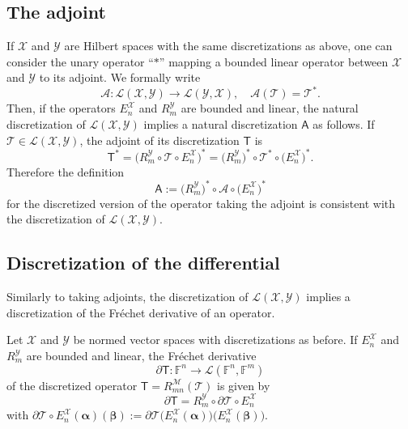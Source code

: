 \documentclass[a4paper]{paper}
\newcommand{\VecSpace}[1]{\mathscr{#1}}
\newcommand{\Field}{\mathbb{F}}
\newcommand{\Op}[1]{\mathcal{#1}}
\newcommand{\DiscOp}[1]{\mathsf{#1}}
\newcommand*{\REST}[2]{\ensuremath{R_{#1}^{#2}}}
\newcommand{\valpha}{\boldsymbol{\alpha}}
\newcommand{\vbeta}{\boldsymbol{\beta}}
\begin{document}
\subsection{The adjoint}

If $\VecSpace{X}$ and $\VecSpace{Y}$ are Hilbert spaces with the same discretizations as above, one can consider the unary operator 
``$\ast$'' mapping a bounded linear operator between $\VecSpace{X}$ and $\VecSpace{Y}$ to its adjoint. We formally write
\[
  \Op{A}: \VecSpace{L}(\VecSpace{X}, \VecSpace{Y}) \to \VecSpace{L}(\VecSpace{Y}, \VecSpace{X}), \quad \Op{A}(\Op{T}) = \Op{T}^*.
\]
Then, if the operators $E_n^{\VecSpace{X}}$ and $R_m^{\VecSpace{Y}}$ are bounded and linear, the natural discretization of 
$\VecSpace{L}(\VecSpace{X}, \VecSpace{Y})$ implies a natural discretization $\DiscOp{A}$ as follows. If $\Op{T} \in 
\VecSpace{L}(\VecSpace{X}, \VecSpace{Y})$, the adjoint of its discretization $\DiscOp{T}$ is
\[
 \DiscOp{T}^* = \big( R_m^{\VecSpace{Y}} \circ \Op{T} \circ E_n^{\VecSpace{X}} \big)^* = \big( R_m^{\VecSpace{Y}} \big)^* \circ \Op{T}^* 
\circ  \big( E_n^{\VecSpace{X}} \big)^*.
\]
Therefore the definition
\[
  \DiscOp{A} := \big( R_m^{\VecSpace{Y}} \big)^* \circ \Op{A} \circ \big( E_n^{\VecSpace{X}} \big)^*
\]
for the discretized version of the operator taking the adjoint is consistent with the discretization of $\VecSpace{L}(\VecSpace{X}, 
\VecSpace{Y})$.


\subsection{Discretization of the differential}

Similarly to taking adjoints, the discretization of $\VecSpace{L}(\VecSpace{X}, \VecSpace{Y})$ implies a discretization of the Fr\'{e}chet 
derivative of an operator.

\begin{theorem}
 Let $\VecSpace{X}$ and $\VecSpace{Y}$ be normed vector spaces with discretizations as before. If $E_n^{\VecSpace{X}}$ and 
 $R_m^{\VecSpace{Y}}$ are bounded and linear, the Fr\'{e}chet derivative
 \[
  \partial\DiscOp{T}: \Field^n \to \VecSpace{L}(\Field^n, \Field^m)
 \]
 of the discretized operator $\DiscOp{T} = \REST{mn}{\VecSpace{M}} (\Op{T})$ is given by
 \[
  \partial\DiscOp{T} = R_m^{\VecSpace{Y}} \circ \partial\Op{T} \circ E_n^{\VecSpace{X}}
 \]
 with $\partial\Op{T} \circ E_n^{\VecSpace{X}}(\valpha)(\vbeta):= \partial\Op{T}\big(E_n^{\VecSpace{X}}(\valpha)\big) 
 \big(E_n^{\VecSpace{X}}(\vbeta)\big)$. 
\end{theorem}
\end{document}
